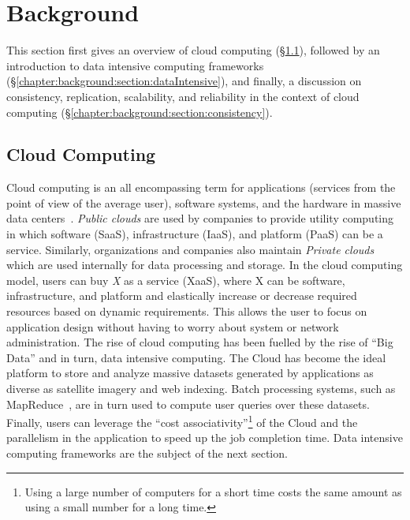 \documentclass[a4paper,12pt,twoside,openright]{report}
\begin{document}
\chapter{Background}\label{chapter:background}
This section first gives an overview of cloud computing
(\S\ref{chapter:background:section:cloudComputing}), followed by an introduction
to data intensive computing frameworks
(\S\ref{chapter:background:section:dataIntensive}), and finally, a discussion on
consistency, replication, scalability, and reliability in the context of cloud
computing (\S\ref{chapter:background:section:consistency}).

\section{Cloud Computing}\label{chapter:background:section:cloudComputing}
Cloud computing is an all encompassing term for applications (services from the
point of view of the average user), software systems, and the hardware in
massive data centers~\cite{Armbrust:2009:ATC}. \emph{Public clouds} are used by
companies to provide utility computing in which software (SaaS), infrastructure
(IaaS), and platform (PaaS) can be a service. Similarly, organizations and
companies also maintain \emph{Private clouds} which are used internally for data
processing and storage. In the cloud computing model, users can buy \emph{X} as
a service (XaaS), where X can be software, infrastructure, and platform and
elastically increase or decrease required resources based on dynamic
requirements. This allows the user to focus on application design without having
to worry about system or network administration. The rise of cloud computing has
been fuelled by the rise of ``Big Data'' and in turn, data intensive computing.
The Cloud has become the ideal platform to store and analyze massive datasets
generated by applications as diverse as satellite imagery and web indexing.
Batch processing systems, such as MapReduce~\cite{Dean:2004:MSD}, are in turn
used to compute user queries over these datasets. Finally, users can leverage
the ``cost associativity''\footnote{Using a large number of computers for a
short time costs the same amount as using a small number for a long time.} of
the Cloud and the parallelism in the application to speed up the job completion
time. Data intensive computing frameworks are the subject of the next section.
\end{document}
